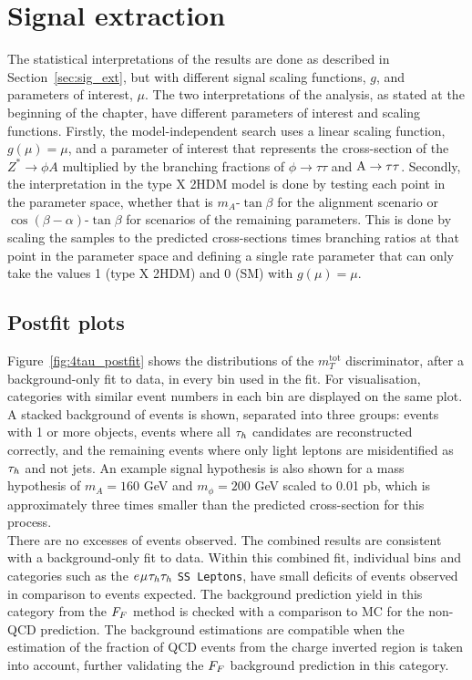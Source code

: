 \section{Signal extraction}

The statistical interpretations of the results are done as described in Section~\ref{sec:sig_ext}, but with different signal scaling functions, $g$, and parameters of interest, $\mu$.
The two interpretations of the analysis, as stated at the beginning of the chapter, have different parameters of interest and scaling functions.
Firstly, the model-independent search uses a linear scaling function, $g(\mu)=\mu$, and a parameter of interest that represents the cross-section of the $Z^{*}\rightarrow \phi A$ multiplied by the branching fractions of $\phi\rightarrow\tau\tau$ and ${\text{A}}\rightarrow\tau\tau$.
Secondly, the interpretation in the type X \ac{2HDM} model is done by testing each point in the parameter space, whether that is $m_{A}$-$\tan\beta$ for the alignment scenario or $\cos(\beta-\alpha)$-$\tan\beta$ for scenarios of the remaining parameters. 
This is done by scaling the samples to the predicted cross-sections times branching ratios at that point in the parameter space and defining a single rate parameter that can only take the values 1 (type X \ac{2HDM}) and 0 (\ac{SM}) with $g(\mu)=\mu$.

\subsection{Postfit plots}

Figure~\ref{fig:4tau_postfit} shows the distributions of the $m_{T}^{\text{tot}}$ discriminator, after a background-only fit to data, in every bin used in the fit.
For visualisation, categories with similar event numbers in each bin are displayed on the same plot.
A stacked background of events is shown, separated into three groups: events with 1 or more \jtth objects, events where all $\tau_{h}$ candidates are reconstructed correctly, and the remaining events where only light leptons are misidentified as $\tau_{h}$ and not jets.
An example signal hypothesis is also shown for a mass hypothesis of $m_A = 160$ GeV and $m_{\phi} = 200$ GeV scaled to 0.01 pb, which is approximately three times smaller than the predicted cross-section for this process. \\

There are no excesses of events observed.
The combined results are consistent with a background-only fit to data.
Within this combined fit, individual bins and categories such as the $e_{}\mu_{}\tau_{h}\tau_{h}$ \texttt{SS Leptons}, have small deficits of events observed in comparison to events expected.
The background prediction yield in this category from the $F_{F}$ method is checked with a comparison to \ac{MC} for the non-\ac{QCD} prediction.
The background estimations are compatible when the estimation of the fraction of \ac{QCD} events from the charge inverted region is taken into account, further validating the $F_{F}$ background prediction in this category.



